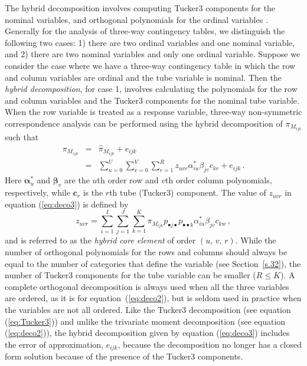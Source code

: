 The hybrid decomposition involves computing  Tucker3 components for the nominal variables, and  orthogonal polynomials for the ordinal variables \citep{lombeh17,lombehkro21}. Generally for the analysis of three-way contingency tables, we distinguish the following two cases: 1) there are two ordinal variables and one nominal variable, and 2) there are two nominal variables and only one ordinal variable. Suppose we consider the case where we have a three-way contingency table in which the row and column variables are ordinal and the tube variable is nominal. Then the \textit{hybrid decomposition}, for case 1, involves calculating the polynomials for the row and column variables and the Tucker3 components for the nominal tube variable. When the row variable is treated as a response variable, three-way non-symmetric correspondence analysis can be performed using the hybrid decomposition of $\pi_{M_{ijk}}$ such that
\begin{eqnarray}
 \pi_{M_{ijk}} & =  & {\widehat{\pi}_{M_{ijk}}}+ e_{ijk} \nonumber \\ & = & \sum_{u=0}^{U} \sum_{v=0}^{V} \sum_{r=1}^{R}  {z}_{uvr} \alpha^*_{iu} \beta_{jv} c_{kr} + e_{ijk} \,.
\label{eq:deco3}
\end{eqnarray}
\noindent Here $\bm{\alpha}^*_u$ and $\bm{\beta}_v$ are the $u$th order row and $v$th order column polynomials, respectively, while $\bm{c}_r$ is the $r$th tube (Tucker3) component. The value of ${z}_{uvr}$ in equation (\ref{eq:deco3}) is defined by
\[
z_{uvr}=\sum_{i=1}^I\sum_{j=1}^J\sum_{k=1}^K  {\pi}_{M_{ijk}}p_{\bullet j\bullet}p_{\bullet\bullet k}\alpha^*_{iu}\beta_{jv} c_{kw} \,,
\]
and is referred to as the {\it hybrid core element} of order $\left(u, \, v, \, r\right)$. While the number of orthogonal polynomials for the rows and columns should always be equal to the number of categories that define the variable (see Section~\ref{s.32}),  the number of Tucker3 components for the tube variable can be smaller ($R\leq K$). 
\noindent A complete orthogonal decomposition is always used when all the three variables are ordered, as it is for equation~(\ref{eq:deco2}), but is seldom used in practice when  the variables are not all ordered. 
Like the Tucker3 decomposition (see equation (\ref{eq:Tucker3})) and unlike the trivariate moment decomposition (see equation (\ref{eq:deco2})), the hybrid decomposition given by equation (\ref{eq:deco3}) includes the error of approximation, $e_{ijk}$, because the decomposition no longer has a closed form solution because of the presence of the Tucker3 components.

